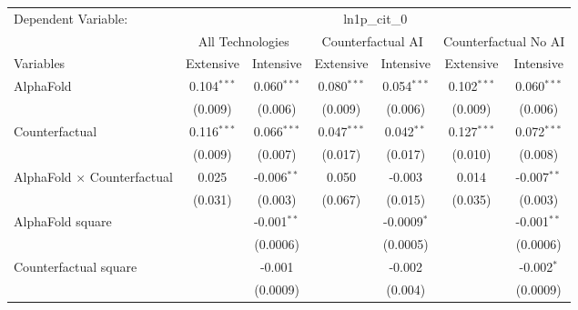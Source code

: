 \begingroup
\centering
\begin{tabular}{lcccccc}
   \tabularnewline \midrule \midrule
   Dependent Variable: & \multicolumn{6}{c}{ln1p\_cit\_0}\\
 & \multicolumn{2}{c}{All Technologies} & \multicolumn{2}{c}{Counterfactual AI} & \multicolumn{2}{c}{Counterfactual No AI} \\
\cmidrule(lr){1-1}\cmidrule(lr){2-3} \cmidrule(lr){4-5} \cmidrule(lr){6-7}
Variables & \multicolumn{1}{c}{Extensive} & \multicolumn{1}{c}{Intensive} & \multicolumn{1}{c}{Extensive} & \multicolumn{1}{c}{Intensive} & \multicolumn{1}{c}{Extensive} & \multicolumn{1}{c}{Intensive} \\
\cmidrule(lr){1-1}\cmidrule(lr){2-2} \cmidrule(lr){3-3} \cmidrule(lr){4-4} \cmidrule(lr){5-5} \cmidrule(lr){6-6} \cmidrule(lr){7-7}
   AlphaFold                          & 0.104$^{***}$ & 0.060$^{***}$ & 0.080$^{***}$ & 0.054$^{***}$ & 0.102$^{***}$ & 0.060$^{***}$\\   
                                      & (0.009)       & (0.006)       & (0.009)       & (0.006)       & (0.009)       & (0.006)\\   
   Counterfactual                     & 0.116$^{***}$ & 0.066$^{***}$ & 0.047$^{***}$ & 0.042$^{**}$  & 0.127$^{***}$ & 0.072$^{***}$\\   
                                      & (0.009)       & (0.007)       & (0.017)       & (0.017)       & (0.010)       & (0.008)\\   
   AlphaFold $\times$ Counterfactual  & 0.025         & -0.006$^{**}$ & 0.050         & -0.003        & 0.014         & -0.007$^{**}$\\   
                                      & (0.031)       & (0.003)       & (0.067)       & (0.015)       & (0.035)       & (0.003)\\   
   AlphaFold square                   &               & -0.001$^{**}$ &               & -0.0009$^{*}$ &               & -0.001$^{**}$\\   
                                      &               & (0.0006)      &               & (0.0005)      &               & (0.0006)\\   
   Counterfactual square              &               & -0.001        &               & -0.002        &               & -0.002$^{*}$\\   
                                      &               & (0.0009)      &               & (0.004)       &               & (0.0009)\\   

\end{tabular}
